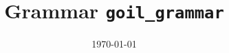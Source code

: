 \documentclass[landscape]{book}
\begin{document}
\title{\Huge{Grammar \texttt{goil\_grammar}}}
\date \today 

\maketitle


\end{document}
